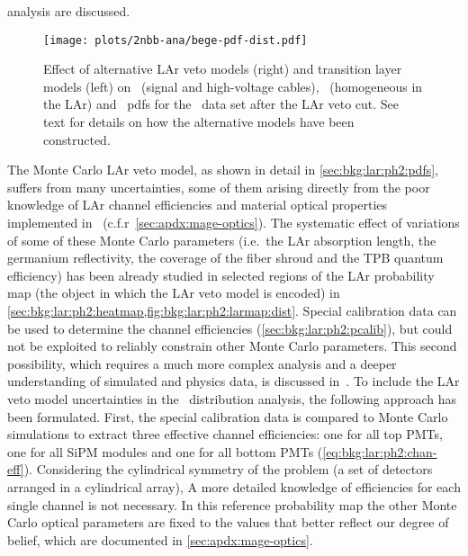 analysis are discussed.

\begin{figure}
  \centering
  \texttt{[image: plots/2nbb-ana/bege-pdf-dist.pdf]}
  \caption{%
    Effect of alternative LAr veto models (right) and transition layer models (left) on
    \kvn\ (signal and high-voltage cables), \kvz\ (homogeneous in the LAr) and \nnbb\
    pdfs for the \enrBEGeII\ data set after the LAr veto cut. See text for details on how
    the alternative models have been constructed.
  }\label{fig:2nbb-ana:pdf-dist}
\end{figure}

\begin{description}[wide]

  \item[LAr veto model] The Monte Carlo LAr veto model, as shown in detail in
    \cref{sec:bkg:lar:ph2:pdfs}, suffers from many uncertainties, some of them arising
    directly from the poor knowledge of LAr channel efficiencies and material optical
    properties implemented in \mage\ (c.f.r~\cref{sec:apdx:mage-optics}). The systematic
    effect of variations of some of these Monte Carlo parameters (i.e.~the LAr absorption
    length, the germanium reflectivity, the coverage of the fiber shroud and the TPB
    quantum efficiency) has been already studied in selected regions of the LAr
    probability map (the object in which the LAr veto model is encoded) in
    \cref{sec:bkg:lar:ph2:heatmap,fig:bkg:lar:ph2:larmap:dist}. Special calibration data
    can be used to determine the channel efficiencies (\cref{sec:bkg:lar:ph2:pcalib}), but
    could not be exploited to reliably constrain other Monte Carlo parameters. This second
    possibility, which requires a much more complex analysis and a deeper understanding of
    simulated and physics data, is discussed in~\cite{Wiesinger2021}.
    \newpar
    To include the LAr veto model uncertainties in the \nnbb\ distribution analysis, the
    following approach has been formulated. First, the special calibration data is
    compared to Monte Carlo simulations to extract three effective channel efficiencies:
    one for all top PMTs, one for all SiPM modules and one for all bottom PMTs
    (\cref{eq:bkg:lar:ph2:chan-eff}). Considering the cylindrical symmetry of the problem
    (a set of detectors arranged in a cylindrical array), A more detailed knowledge of
    efficiencies for each single channel is not necessary. In this reference probability
    map the other Monte Carlo optical parameters are fixed to the values that better
    reflect our degree of belief, which are documented in \cref{sec:apdx:mage-optics}.

\end{description}
